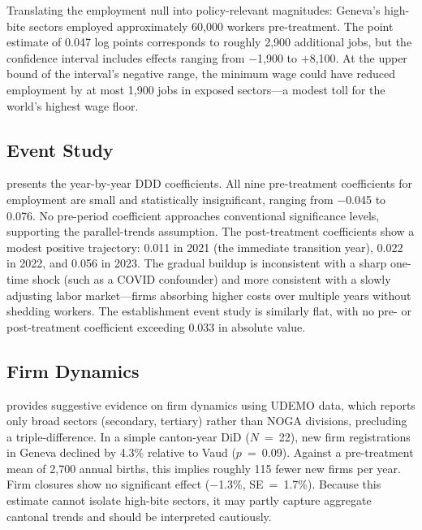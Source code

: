 \documentclass[12pt]{article}
\begin{document}
Translating the employment null into policy-relevant magnitudes: Geneva's high-bite sectors employed approximately 60,000 workers pre-treatment. The point estimate of 0.047 log points corresponds to roughly 2,900 additional jobs, but the confidence interval includes effects ranging from $-$1,900 to $+$8,100. At the upper bound of the interval's negative range, the minimum wage could have reduced employment by at most 1,900 jobs in exposed sectors---a modest toll for the world's highest wage floor.

\subsection{Event Study}



 presents the year-by-year DDD coefficients. All nine pre-treatment coefficients for employment are small and statistically insignificant, ranging from $-$0.045 to 0.076. No pre-period coefficient approaches conventional significance levels, supporting the parallel-trends assumption. The post-treatment coefficients show a modest positive trajectory: 0.011 in 2021 (the immediate transition year), 0.022 in 2022, and 0.056 in 2023. The gradual buildup is inconsistent with a sharp one-time shock (such as a COVID confounder) and more consistent with a slowly adjusting labor market---firms absorbing higher costs over multiple years without shedding workers. The establishment event study is similarly flat, with no pre- or post-treatment coefficient exceeding 0.033 in absolute value.

\subsection{Firm Dynamics}



 provides suggestive evidence on firm dynamics using UDEMO data, which reports only broad sectors (secondary, tertiary) rather than NOGA divisions, precluding a triple-difference. In a simple canton-year DiD ($N$~=~22), new firm registrations in Geneva declined by 4.3\% relative to Vaud ($p$~=~0.09). Against a pre-treatment mean of 2,700 annual births, this implies roughly 115 fewer new firms per year. Firm closures show no significant effect ($-$1.3\%, SE~=~1.7\%). Because this estimate cannot isolate high-bite sectors, it may partly capture aggregate cantonal trends and should be interpreted cautiously.
\end{document}
